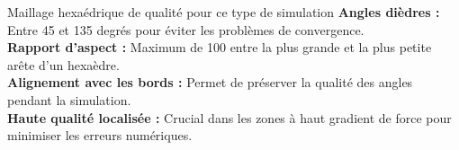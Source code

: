 \documentclass{beamer}
\begin{document}
\begin{frame}{Maillage hexaédrique de qualité pour ce type de simulation}
    \small{
        \textbf{Angles dièdres :} Entre 45 et 135 degrés pour éviter les problèmes de convergence.\\
    }
    \vspace{0.5cm}
    \small{
        \textbf{Rapport d'aspect :} Maximum de 100 entre la plus grande et la plus petite arête d'un hexaèdre.\\
    }
    \vspace{0.5cm}
    \small{
        \textbf{Alignement avec les bords :} Permet de préserver la qualité des angles pendant la simulation.\\
    }
    \vspace{0.5cm}
    \small{
        \textbf{Haute qualité localisée :} Crucial dans les zones à haut gradient de force pour minimiser les erreurs numériques.\\
    }
\end{frame}
\end{document}
